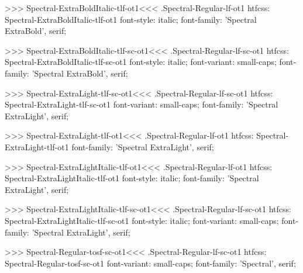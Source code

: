 >>>
\<Spectral-ExtraBoldItalic-tlf-ot1\><<<
.Spectral-Regular-lf-ot1
htfcss:  Spectral-ExtraBoldItalic-tlf-ot1  font-style: italic; font-family: 'Spectral ExtraBold', serif;

>>>
\<Spectral-ExtraBoldItalic-tlf-sc-ot1\><<<
.Spectral-Regular-lf-sc-ot1
htfcss:  Spectral-ExtraBoldItalic-tlf-sc-ot1  font-style: italic; font-variant: small-caps; font-family: 'Spectral ExtraBold', serif;

>>>
\<Spectral-ExtraLight-tlf-sc-ot1\><<<
.Spectral-Regular-lf-sc-ot1
htfcss:  Spectral-ExtraLight-tlf-sc-ot1  font-variant: small-caps; font-family: 'Spectral ExtraLight', serif;

>>>
\<Spectral-ExtraLight-tlf-ot1\><<<
.Spectral-Regular-lf-ot1
htfcss:  Spectral-ExtraLight-tlf-ot1  font-family: 'Spectral ExtraLight', serif;

>>>
\<Spectral-ExtraLightItalic-tlf-ot1\><<<
.Spectral-Regular-lf-ot1
htfcss:  Spectral-ExtraLightItalic-tlf-ot1  font-style: italic; font-family: 'Spectral ExtraLight', serif;

>>>
\<Spectral-ExtraLightItalic-tlf-sc-ot1\><<<
.Spectral-Regular-lf-sc-ot1
htfcss:  Spectral-ExtraLightItalic-tlf-sc-ot1  font-style: italic; font-variant: small-caps; font-family: 'Spectral ExtraLight', serif;

>>>
\<Spectral-Regular-tosf-sc-ot1\><<<
.Spectral-Regular-lf-sc-ot1
htfcss:  Spectral-Regular-tosf-sc-ot1  font-variant: small-caps; font-family: 'Spectral', serif;

